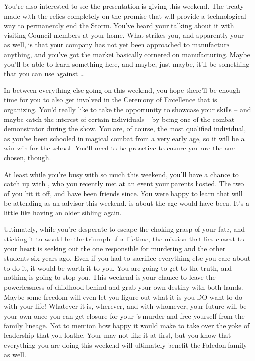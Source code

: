 \documentclass[char]{GL2020}
\begin{document}
You're also interested to see the presentation \cHeadScientist{\full} is giving this weekend.  The treaty \cDiplomat{} made with the \pFarm{} relies completely on the promise that \pTech{} will provide a technological way to permanently end the Storm. You've heard your \cFaledonParent{\parent} talking about it with visiting Council members at your home. What strikes you, and apparently your \cFaledonParent{\parent} as well, is that your company has not yet been approached to manufacture anything, and you've got the market basically cornered on manufacturing. Maybe you'll be able to learn something here, and maybe, just maybe, it'll be something that you can use against \cDiplomat{}\ldots

In between everything else going on this weekend, you hope there'll be enough time for you to also get involved in the Ceremony of Excellence that \cMusic{\full} is organizing. You'd really like to take the opportunity to showcase your skills – and maybe catch the interest of certain individuals – by being one of the combat demonstrator during the show. You are, of course, the most qualified individual, as you've been schooled in magical combat from a very early age, so it will be a win-win for the school. You'll need to be proactive to ensure you are the one chosen, though. 

At least while you're busy with so much this weekend, you'll have a chance to catch up with \cAssistantScientist{\full}, who you recently met at an event your parents hosted. The two of you hit it off, and have been friends since. You were happy to learn that \cAssistantScientist{\they} will be attending as an advisor this weekend. \cAssistantScientist{} is about the age \cHeirSibling{} would have been. It's a little like having an older sibling again.

Ultimately, while you're desperate to escape the choking grasp of your fate, and sticking it to \cDiplomat{} would be the triumph of a lifetime, the mission that lies closest to your heart is seeking out the one responsible for murdering \cHeirSibling{} and the other students six years ago. Even if you had to sacrifice everything else you care about to do it, it would be worth it to you. You are going to get to the truth, and nothing is going to stop you. This weekend is your chance to leave the powerlessness of childhood behind and grab your own destiny with both hands. Maybe some freedom will even let you figure out what it is you DO want to do with your life! Whatever it is, wherever, and with whomever, your future will be your own once you can get closure for your \cHeirSibling{\sibling}'s murder and free yourself from the family lineage. Not to mention how happy it would make \cAmbition{} to take over the yoke of leadership that you loathe. Your \cFaledonParent{\parent} may not like it at first, but you know that everything you are doing this weekend will ultimately benefit the Faledon family as well.
\end{document}
